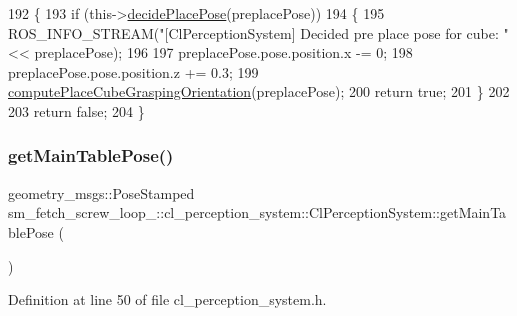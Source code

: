 \begin{DoxyCode}
192             \{
193                 \textcolor{keywordflow}{if} (this->\hyperlink{classsm__fetch__screw__loop__1_1_1cl__perception__system_1_1ClPerceptionSystem_addd61eca413e2d927c636ef7fddaf91d}{decidePlacePose}(preplacePose))
194                 \{
195                     ROS\_INFO\_STREAM(\textcolor{stringliteral}{"[ClPerceptionSystem] Decided pre place pose for cube: "} << 
      preplacePose);
196 
197                     preplacePose.pose.position.x -= 0;
198                     preplacePose.pose.position.z += 0.3;
199                     \hyperlink{classsm__fetch__screw__loop__1_1_1cl__perception__system_1_1ClPerceptionSystem_a65dd56e54c2d5e656d6395abd43103d9}{computePlaceCubeGraspingOrientation}(preplacePose);
200                     \textcolor{keywordflow}{return} \textcolor{keyword}{true};
201                 \}
202 
203                 \textcolor{keywordflow}{return} \textcolor{keyword}{false};
204             \}
\end{DoxyCode}
\mbox{\label{classsm__fetch__screw__loop__1_1_1cl__perception__system_1_1ClPerceptionSystem_a8d206006205507fb2a34c0fc0fa80abb}} 
\subsubsection{\texorpdfstring{get\+Main\+Table\+Pose()}{getMainTablePose()}}
{\footnotesize\ttfamily geometry\+\_\+msgs\+::\+Pose\+Stamped sm\+\_\+fetch\+\_\+screw\+\_\+loop\+\_\+::cl\+\_\+perception\+\_\+system\+::\+Cl\+Perception\+System\+::get\+Main\+Table\+Pose (\begin{DoxyParamCaption}{ }\end{DoxyParamCaption})\hspace{0.3cm}{\ttfamily [inline]}}



Definition at line 50 of file cl\+\_\+perception\+\_\+system.\+h.




